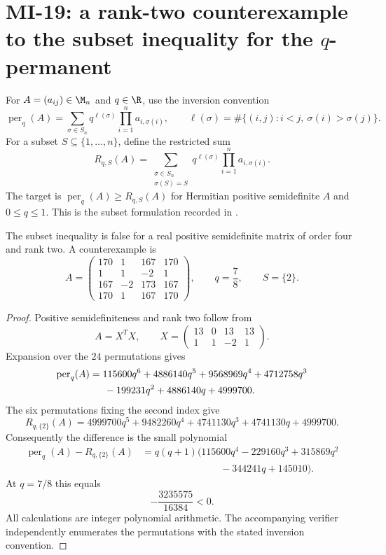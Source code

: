 \section{MI-19: a rank-two counterexample to the subset inequality for the \texorpdfstring{$q$}{q}-permanent}
\label{sec:mi19}
For $A=(a_{ij})\in\M_n$ and $q\in\R$, use the inversion convention
\[
 \operatorname{per}_q(A)=\sum_{\sigma\in S_n}q^{\ell(\sigma)}\prod_{i=1}^n a_{i,\sigma(i)},\qquad
 \ell(\sigma)=\#\{(i,j):i<j,\ \sigma(i)>\sigma(j)\}.
\]
For a subset $S\subseteq\{1,\ldots,n\}$, define the restricted sum
\[
 R_{q,S}(A)=\sum_{\substack{\sigma\in S_n\\\sigma(S)=S}}
 q^{\ell(\sigma)}\prod_{i=1}^n a_{i,\sigma(i)}.
\]
The target is $\operatorname{per}_q(A)\geq R_{q,S}(A)$ for Hermitian positive semidefinite $A$ and $0\leq q\leq1$. This is the subset formulation recorded in \cite[Conjecture 3, equation (5.1)]{Fonseca2018}.

\begin{theorem}
The subset inequality is false for a real positive semidefinite matrix of order four and rank two. A counterexample is
\[
 A=\begin{pmatrix}
 170&1&167&170\\
 1&1&-2&1\\
 167&-2&173&167\\
 170&1&167&170
 \end{pmatrix},\qquad q=\frac78,\qquad S=\{2\}.
\]
\end{theorem}
\begin{proof}
Positive semidefiniteness and rank two follow from
\[
 A=X^TX,\qquad X=\begin{pmatrix}13&0&13&13\\1&1&-2&1\end{pmatrix}.
\]
Expansion over the $24$ permutations gives
\begin{align*}
 \operatorname{per}_q(A)
 &=115600q^6+4886140q^5+9568969q^4+4712758q^3\\
 &\hspace{1.5em}-199231q^2+4886140q+4999700.
\end{align*}
The six permutations fixing the second index give
\[
 R_{q,\{2\}}(A)=4999700q^5+9482260q^4+4741130q^3+4741130q+4999700.
\]
Consequently the difference is the small polynomial
\begin{align*}
 \operatorname{per}_q(A)-R_{q,\{2\}}(A)
 &=q(q+1)\bigl(115600q^4-229160q^3+315869q^2\\
 &\hspace{8em}-344241q+145010\bigr).
\end{align*}
At $q=7/8$ this equals
\[
 -\frac{3235575}{16384}<0.
\]
All calculations are integer polynomial arithmetic. The accompanying verifier independently enumerates the permutations with the stated inversion convention.
\end{proof}

